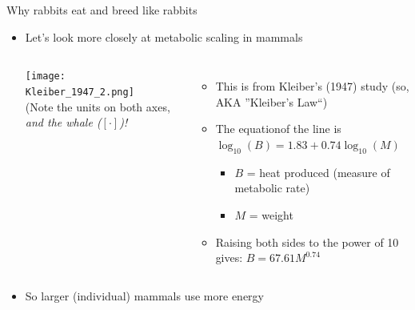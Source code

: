 \begin{frame}{Why rabbits eat and breed like rabbits}

  \begin{itemize} [<+->]\setlength{\itemindent}{-1em} \itemsep16pt
    \item Let's look more closely at metabolic scaling in mammals

    \begin{columns}[c]
      \centering
      \texttt{[image: Kleiber\_1947\_2.png]}\\
         (Note the units on both axes, {\pause \small \it and the whale ($[\cdot]$)!}
         \centering

         \begin{itemize}[<+->]\setlength{\itemindent}{-1em} \itemsep0pt 
          \item This is from Kleiber's (1947) study (so, AKA ''Kleiber's Law``)
          \item {} The equation\footnotemark of the line is $\log_{10}(B) = 1.83 + 0.74 \log_{10}(M)$\par
            \begin{itemize}\setlength{\itemindent}{-1em}
              \item $B$ = heat produced (measure of metabolic rate)
              \item $M$ = weight
            \end{itemize}
            \item  Raising both sides to the power of 10 gives: $B = 67.61 M^{0.74}$
          \end{itemize}
      \end{columns}

    \item So larger (individual) mammals use more energy 
  
  \end{itemize}


  \end{frame}

